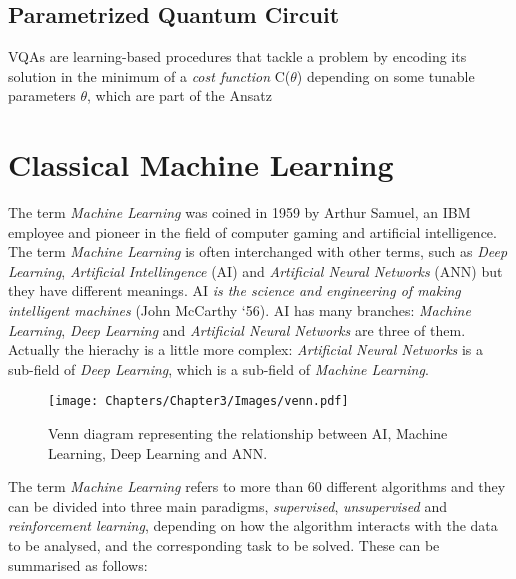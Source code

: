 \subsection{Parametrized Quantum Circuit}

VQAs are learning-based procedures that tackle a problem by encoding its solution in the 
minimum of a \textit{cost function} C(\textbf{$\theta$}) depending on some tunable parameters \textbf{$\theta$}, which
are part of the Ansatz




\section{Classical Machine Learning}

The term \textit{Machine Learning} was coined in 1959 by Arthur Samuel, an IBM employee and pioneer 
in the field of computer gaming and artificial intelligence.
The term \textit{Machine Learning} is often interchanged with other terms, such as \textit{Deep Learning}, 
\textit{Artificial Intellingence} (AI) and \textit{Artificial Neural Networks} (ANN) but they have different 
meanings.
AI \textit{is the science and engineering of making intelligent machines} (John McCarthy ‘56). 
AI has many branches: \textit{Machine Learning}, \textit{Deep Learning} and \textit{Artificial Neural Networks} 
are three of them.
Actually the hierachy is a little more complex: \textit{Artificial Neural Networks} is a sub-field of 
\textit{Deep Learning}, which is a sub-field of \textit{Machine Learning}.\\

\begin{figure}[h]
\centering
\texttt{[image: Chapters/Chapter3/Images/venn.pdf]}
\caption{Venn diagram representing the relationship between AI, Machine Learning, Deep Learning and ANN.}
\end{figure}

The term \textit{Machine Learning} refers to more than 60 different algorithms and they can be divided 
into three main paradigms, \textit{supervised}, \textit{unsupervised} and
\textit{reinforcement learning}, depending on how the algorithm interacts with the data to be analysed, and
the corresponding task to be solved. These can be summarised as follows:

